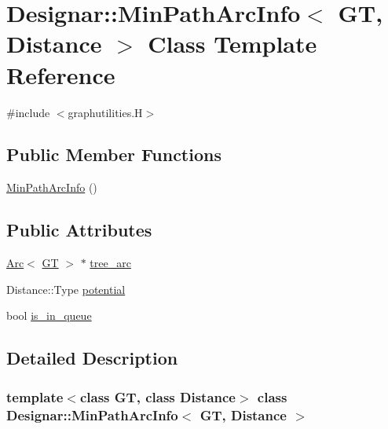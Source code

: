 \hypertarget{class_designar_1_1_min_path_arc_info}{}\section{Designar\+:\+:Min\+Path\+Arc\+Info$<$ GT, Distance $>$ Class Template Reference}
\label{class_designar_1_1_min_path_arc_info}


{\ttfamily \#include $<$graphutilities.\+H$>$}

\subsection*{Public Member Functions}
\begin{DoxyCompactItemize}
\item 
\hyperlink{class_designar_1_1_min_path_arc_info_a243f02fd41ed0786f6f2d907843d0598}{Min\+Path\+Arc\+Info} ()
\end{DoxyCompactItemize}
\subsection*{Public Attributes}
\begin{DoxyCompactItemize}
\item 
\hyperlink{namespace_designar_a3f55fb5513d62ff47cbc8f72b8e95d6f}{Arc}$<$ \hyperlink{demo-buildgraph_8_c_a3001c40d2c31ca87ed96cd7d1334a55e}{GT} $>$ $\ast$ \hyperlink{class_designar_1_1_min_path_arc_info_a2f5c165e547c75ec582dd3724a93137c}{tree\+\_\+arc}
\item 
Distance\+::\+Type \hyperlink{class_designar_1_1_min_path_arc_info_ae53cddd12f7488ab3daf3711963b533d}{potential}
\item 
bool \hyperlink{class_designar_1_1_min_path_arc_info_a97d17f60e2e02381708f68b79c6bf82d}{is\+\_\+in\+\_\+queue}
\end{DoxyCompactItemize}


\subsection{Detailed Description}
\subsubsection*{template$<$class GT, class Distance$>$\newline
class Designar\+::\+Min\+Path\+Arc\+Info$<$ G\+T, Distance $>$}




